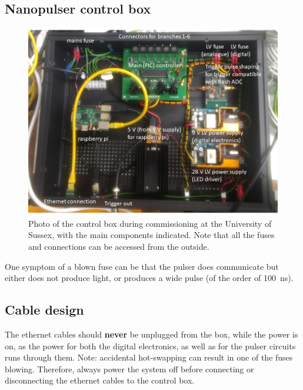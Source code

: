 

\subsection*{Nanopulser control box}

\begin{figure}
\begin{center}	
  \includegraphics[width=0.75\linewidth]{figures/controlbox.jpg}
  \caption{Photo of the control box during commissioning at the University of Sussex, with the main components indicated. Note that all the fuses and connections can be accessed from the outside.}
  \label{figure:controlbox}
\end{center}
\end{figure}

One symptom of a blown fuse can be that  the pulser does communicate but either does not produce light, or produces a wide pulse (of the order of 100~ns).

\subsection*{Cable design}

The ethernet cables should {\bf never} be unplugged from the box, while the power is on, as the power for both the digital electronics, as well as for the pulser circuits runs through them. Note: accidental hot-swapping can result in one of the fuses blowing. Therefore, always power the system off before connecting or disconnecting the ethernet cables to the control box.

